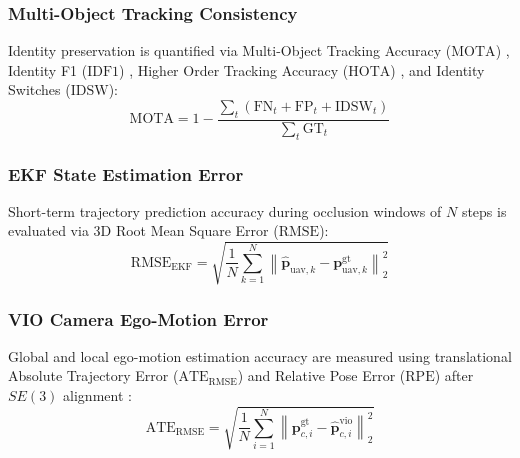 \documentclass[conference]{IEEEtran}
\begin{document}
\subsubsection{Multi-Object Tracking Consistency}
Identity preservation is quantified via Multi-Object Tracking Accuracy ($\text{MOTA}$) \cite{ref19}, Identity F1 ($\text{IDF1}$) \cite{ref17}, Higher Order Tracking Accuracy ($\text{HOTA}$) \cite{ref16}, and Identity Switches ($\text{IDSW}$):
\begin{equation}
\text{MOTA} = 1 - \frac{\sum_{t}(\text{FN}_t + \text{FP}_t + \text{IDSW}_t)}{\sum_{t}\text{GT}_t}
\label{eq:mota}
\end{equation}

\subsubsection{EKF State Estimation Error}
Short-term trajectory prediction accuracy during occlusion windows of $N$ steps is evaluated via 3D Root Mean Square Error ($\text{RMSE}$):
\begin{equation}
\text{RMSE}_{\text{EKF}} = \sqrt{\frac{1}{N}\sum_{k=1}^{N}\left\|\hat{\mathbf{p}}_{\text{uav},k} - \mathbf{p}_{\text{uav},k}^{\text{gt}}\right\|_2^2}
\label{eq:rmse}
\end{equation}

\subsubsection{VIO Camera Ego-Motion Error}
Global and local ego-motion estimation accuracy are measured using translational Absolute Trajectory Error ($\text{ATE}_{\text{RMSE}}$) and Relative Pose Error ($\text{RPE}$) after $SE(3)$ alignment \cite{ref18}:
\begin{equation}
\text{ATE}_{\text{RMSE}} = \sqrt{\frac{1}{N}\sum_{i=1}^{N}\left\|\mathbf{p}_{c,i}^{\text{gt}} - \hat{\mathbf{p}}_{c,i}^{\text{vio}}\right\|_2^2}
\label{eq:ate}
\end{equation}
\end{document}
